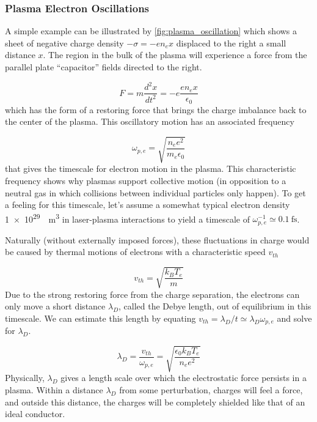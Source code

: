 \subsubsection{Plasma Electron Oscillations}
A simple example can be illustrated by \cref{fig:plasma_oscillation} which shows a sheet of negative charge density $-\sigma = -e n_e x$ displaced to the right a small distance $x$. The region in the bulk of the plasma will experience a force from the parallel plate ``capacitor'' fields directed to the right.

\begin{equation}
	F = m \frac{d^2 x}{d t^2} = - e \frac{e n_e x}{\epsilon_0}
\end{equation}
which has the form of a restoring force that brings the charge imbalance back to the center of the plasma. This oscillatory motion has an associated frequency 

\begin{equation}
	\omega_{p,e} = \sqrt{\frac{n_e e^2}{m_e \epsilon_0}} \label{eq:omegape}
\end{equation}
that gives the timescale for electron motion in the plasma. This characteristic frequency shows why plasmas support collective motion (in opposition to a neutral gas in which collisions between individual particles only happen). To get a feeling for this timescale, let's assume a somewhat typical electron density \SI{1e29}{\per \meter \cubed} in laser-plasma interactions to yield a timescale of $\omega_{p,e}^{-1} \simeq \SI{0.1}{\femto \second}$.

Naturally (without externally imposed forces), these fluctuations in charge would be caused by thermal motions of electrons with a characteristic speed $v_{th}$ 

\begin{equation}
	v_{th} = \sqrt{\frac{k_B T_e}{m}} \label{eq:vthermal}
\end{equation}
Due to the strong restoring force from the charge separation, the electrons can only move a short distance $\lambda_D$, called the Debye length, out of equilibrium in this timescale. We can estimate this length by equating $v_{th} = \lambda_D / t \simeq \lambda_D \omega_{p,e}$ and solve for $\lambda_D$.

\begin{equation}
	\lambda_D = \frac{v_{th}}{\omega_{p,e}} = \sqrt{\frac{\epsilon_0 k_B T_e}{n_e e^2}} \label{eq:debye}
\end{equation} 
Physically, $\lambda_D$ gives a length scale over which the electrostatic force persists in a plasma. Within a distance $\lambda_D$ from some perturbation, charges will feel a force, and outside this distance, the charges will be completely shielded like that of an ideal conductor. 

